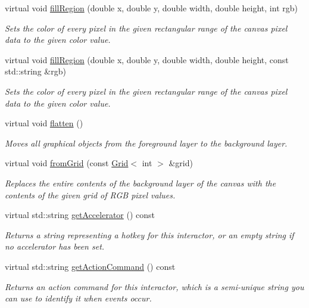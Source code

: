 \begin{DoxyCompactItemize}
virtual void \mbox{\hyperlink{classGCanvas_af4146bdcb26135b739b9b4f13db03435}{fill\+Region}} (double x, double y, double width, double height, int rgb)
\begin{DoxyCompactList}\small\item\em Sets the color of every pixel in the given rectangular range of the canvas pixel data to the given color value. \end{DoxyCompactList}\item 
virtual void \mbox{\hyperlink{classGCanvas_a762c611a5065687112018e7a0ab10c84}{fill\+Region}} (double x, double y, double width, double height, const std\+::string \&rgb)
\begin{DoxyCompactList}\small\item\em Sets the color of every pixel in the given rectangular range of the canvas pixel data to the given color value. \end{DoxyCompactList}\item 
virtual void \mbox{\hyperlink{classGCanvas_a4c4590df33ce47ad8a42e06f9f44fc93}{flatten}} ()
\begin{DoxyCompactList}\small\item\em Moves all graphical objects from the foreground layer to the background layer. \end{DoxyCompactList}\item 
virtual void \mbox{\hyperlink{classGCanvas_a46b18491b5230c765fbd9b8c7a095587}{from\+Grid}} (const \mbox{\hyperlink{classGrid}{Grid}}$<$ int $>$ \&grid)
\begin{DoxyCompactList}\small\item\em Replaces the entire contents of the background layer of the canvas with the contents of the given grid of R\+GB pixel values. \end{DoxyCompactList}\item 
virtual std\+::string \mbox{\hyperlink{classGInteractor_a69f8d23ed8f207fbecad99960776e942}{get\+Accelerator}} () const
\begin{DoxyCompactList}\small\item\em Returns a string representing a hotkey for this interactor, or an empty string if no accelerator has been set. \end{DoxyCompactList}\item 
virtual std\+::string \mbox{\hyperlink{classGInteractor_a94eb4276000c4fdfb508ce9e6317a82a}{get\+Action\+Command}} () const
\begin{DoxyCompactList}\small\item\em Returns an action command for this interactor, which is a semi-\/unique string you can use to identify it when events occur. \end{DoxyCompactList}\item 

\end{DoxyCompactItemize}
